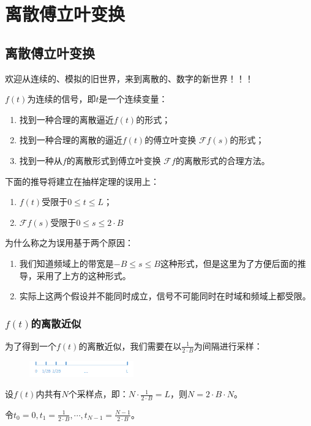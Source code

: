 \chapter{离散傅立叶变换}
\section{离散傅立叶变换}
欢迎从连续的、模拟的旧世界，来到离散的、数字的新世界！！！

$f(t)$为连续的信号，即$t$是一个连续变量：
\begin{enumerate}
	\item 找到一种合理的离散逼近$f(t)$的形式；
	\item 找到一种合理的离散的逼近$f(t)$的傅立叶变换 $\mathcal{F}f(s)$的形式；
	\item 找到一种从$f$的离散形式到傅立叶变换 $\mathcal{F}f$的离散形式的合理方法。
\end{enumerate}

下面的推导将建立在抽样定理的误用上：
\begin{enumerate}
	\item $f(t)$受限于$0\leq t\leq L$；
	\item $\mathcal{F}f(s)$受限于$0\leq s\leq 2\cdot B$
\end{enumerate}

为什么称之为误用基于两个原因：
\begin{enumerate}
	\item 我们知道频域上的带宽是$-B\leq s\leq B$这种形式，但是这里为了方便后面的推导，采用了上方的这种形式。
	\item 实际上这两个假设并不能同时成立，信号不可能同时在时域和频域上都受限。
\end{enumerate}

\subsection{$f(t)$的离散近似}
为了得到一个$f(t)$的离散近似，我们需要在以$\frac{1}{2\cdot B}$为间隔进行采样：
\begin{figure}[H]
	\centering
	\includegraphics[width=0.4\textwidth]{assets/DFT1.png}
\end{figure}
设$f(t)$内共有$N$个采样点，即：$N\cdot \frac{1}{2\cdot B}=L$，则$N=2\cdot B\cdot N$。

令$t_0=0,t_1=\frac{1}{2\cdot B},\cdots,t_{N-1}=\frac{N-1}{2\cdot B}$。

